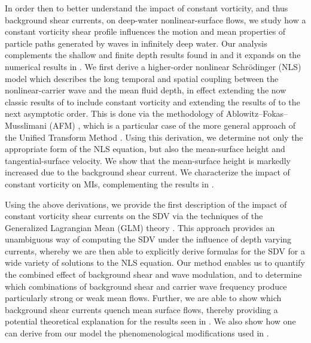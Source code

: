 \documentclass{JFM_Style/jfm}
\begin{document}
In order then to better understand the impact of constant vorticity, and thus background shear currents, on deep-water nonlinear-surface flows, we study how a constant vorticity shear profile influences the motion and mean properties of particle paths generated by waves in infinitely deep water. Our analysis complements the shallow and finite depth results found in \cite{constantin,borluk} and it expands on the numerical results in \cite{nachbin}. We first derive a higher-order nonlinear Schr\"{o}dinger (NLS) model which describes the long temporal and spatial coupling between the nonlinear-carrier wave and the mean fluid depth, in effect extending the now classic results of \cite{dysthe} to include constant vorticity and extending the results of \cite{thomas2012nonlinear} to the next asymptotic order.  This is done via the methodology of Ablowitz--Fokas--Musslimani (AFM) \cite{afm,ashton}, which is a particular case of the more general approach of the Unified Transform Method \cite{fokas2008}.  Using this derivation, we determine not only the appropriate form of the NLS equation, but also the mean-surface height and tangential-surface velocity. We show that the mean-surface height is markedly increased due to the background shear current.  We characterize the impact of constant vorticity on MIs, complementing the results in \cite{thomas2012nonlinear}.  %

Using the above derivations, we provide the first description of the impact of constant vorticity shear currents on the SDV via the techniques of the Generalized Lagrangian Mean (GLM) theory \cite{andrews,buhler}. This approach provides an unambiguous way of computing the SDV under the influence of depth varying currents, whereby we are then able to explicitly derive formulas for the SDV for a wide variety of solutions to the NLS equation. Our method enables us to quantify the combined effect of background shear and wave modulation, and to determine which combinations of background shear and carrier wave frequency produce particularly strong or weak mean flows.  Further, we are able to show which background shear currents quench mean surface flows, thereby providing a potential theoretical explanation for the results seen in \cite{smith}. We also show how one can derive from our model the phenomenological modifications used in \cite{breivik}. 
\end{document}
